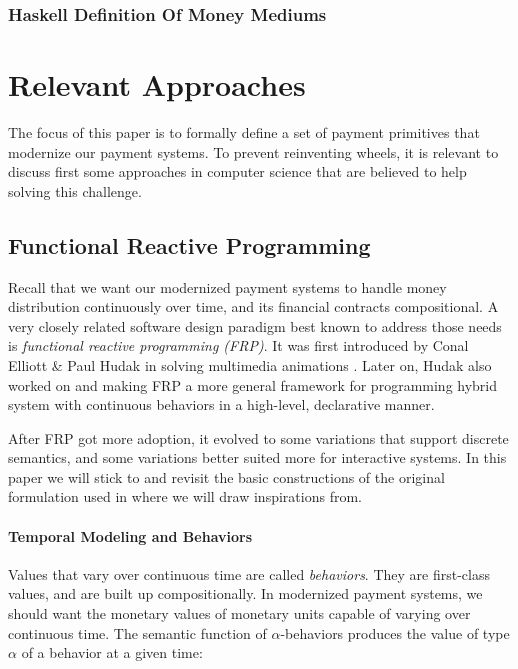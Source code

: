 \subsubsection{Haskell Definition Of Money Mediums}




\section{Relevant Approaches}

The focus of this paper is to formally define a set of payment primitives that modernize our payment systems. To prevent
reinventing wheels, it is relevant to discuss first some approaches in computer science that are believed to help
solving this challenge.

\subsection{Functional Reactive Programming}

Recall that we want our modernized payment systems to handle money distribution continuously over time, and its financial
contracts compositional. A very closely related software design paradigm best known to address those needs is
\textit{functional reactive programming (FRP)}. It was first introduced by Conal Elliott \& Paul Hudak in solving
multimedia animations \cite{elliott1997functional}. Later on, Hudak also worked on \cite{hudak2002arrows} and
\cite{wan2000functional} making FRP a more general framework for programming hybrid system with continuous behaviors in
a high-level, declarative manner.

After FRP got more adoption, it evolved to some variations that support discrete semantics, and some variations better
suited more for interactive systems. In this paper we will stick to and revisit the basic constructions of the original
formulation used in \cite{elliott1997functional} where we will draw inspirations from.

\paragraph{Temporal Modeling and Behaviors}

Values that vary over continuous time are called \textit{behaviors}. They are first-class values, and are built up
compositionally. In modernized payment systems, we should want the monetary values of monetary units capable of varying over
continuous time. The semantic function of $\alpha$-behaviors produces the value of type $\alpha$ of a behavior at a given
time:

